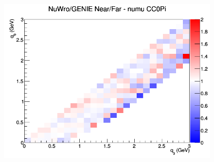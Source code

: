 \documentclass[12pt]{article}
\begin{document}
\begin{figure}[h]
\endminipage
{}
\includegraphics[width=\linewidth]{q0_q3/nominal/ratios/CC0Pi_NuWro_GENIE_numu_NF_q3_q0.png}
\endminipage
\newline
\end{figure}
\clearpage
\end{document}
